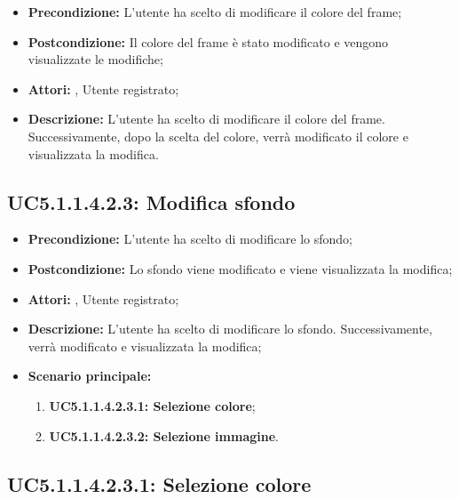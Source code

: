 \begin{itemize}
	\item \textbf{Precondizione:} L'utente ha scelto di modificare il colore del frame;
	\item \textbf{Postcondizione:} Il colore del frame è stato modificato e vengono visualizzate le modifiche;
	\item \textbf{Attori:} , Utente registrato;
	\item \textbf{Descrizione:} L'utente ha scelto di modificare il colore del frame.  Successivamente, dopo la scelta del colore, verrà modificato il colore e visualizzata la modifica.
\end{itemize}
\subsection{ UC5.1.1.4.2.3: Modifica sfondo}

\begin{itemize}
	\item \textbf{Precondizione:} L'utente ha scelto di modificare lo sfondo;
	\item \textbf{Postcondizione:} Lo sfondo viene modificato e viene visualizzata la modifica;
	\item \textbf{Attori:} , Utente registrato;
	\item \textbf{Descrizione:} L'utente ha scelto di modificare lo sfondo.  Successivamente, verrà modificato e visualizzata la modifica;
	\item \textbf{Scenario principale:}
	\begin{enumerate}
		\item \textbf{ UC5.1.1.4.2.3.1: Selezione colore};
		\item \textbf{ UC5.1.1.4.2.3.2: Selezione immagine}.
	\end{enumerate}
\end{itemize}
\subsection{ UC5.1.1.4.2.3.1: Selezione colore}

